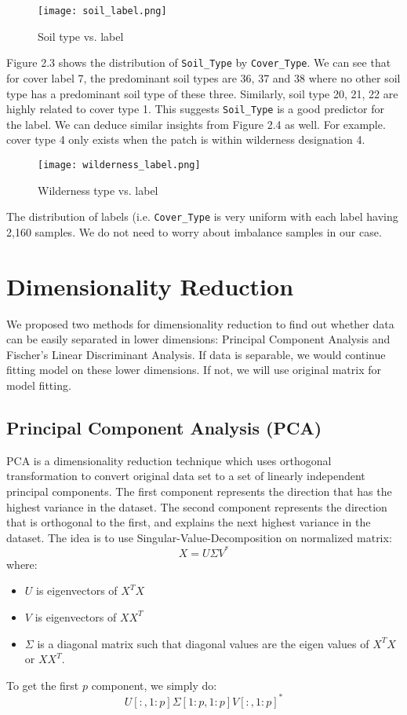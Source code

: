 \documentclass[11pt]{article}
\begin{document}
\begin{figure}[h]
\label{eda3}
\begin{center}
\texttt{[image: soil\_label.png]}
\end{center}
\caption{Soil type vs. label}
\end{figure}

\noindent Figure 2.3 shows the distribution of \texttt{Soil\_Type} by \texttt{Cover\_Type}. We can see that for cover label 7, the predominant soil types are 36, 37 and 38 where no other soil type has a predominant soil type of these three. Similarly, soil type 20, 21, 22 are highly related to cover type 1. This suggests \texttt{Soil\_Type} is a good predictor for the label. We can deduce similar insights from Figure 2.4 as well. For example. cover type 4 only exists when the patch is within wilderness designation 4.

\begin{figure}[h]
\label{eda4}
\begin{center}
\texttt{[image: wilderness\_label.png]}
\end{center}
\caption{Wilderness type vs. label}
\end{figure}

\noindent The distribution of labels (i.e. \texttt{Cover\_Type} is very uniform with each label having 2,160 samples. We do not need to worry about imbalance samples in our case.

\newpage

\section{Dimensionality Reduction}

We proposed two methods for dimensionality reduction to find out whether data can be easily separated in lower dimensions: Principal Component Analysis and Fischer's Linear Discriminant Analysis. If data is separable, we would continue fitting model on these lower dimensions. If not, we will use original matrix for model fitting.

\subsection{Principal Component Analysis (PCA)}
PCA is a dimensionality reduction technique which uses orthogonal transformation to convert original data set to a set of linearly independent principal components. The first component represents the direction that has the highest variance in the dataset. The second component represents the direction that is orthogonal to the first, and explains the next highest variance in the dataset. The idea is to use Singular-Value-Decomposition on normalized matrix:
$$X = U\Sigma V^*$$
where:
\begin{itemize}
\setlength\itemsep{0cm}
\item $U$ is eigenvectors of $X^TX$
\item $V$ is eigenvectors of $XX^T$
\item $\Sigma$ is a diagonal matrix such that diagonal values are the eigen values of $X^TX$ or $XX^T$.
\end{itemize}
To get the first $p$ component, we simply do:
$$U[:,1:p]\Sigma[1:p,1:p] V[:,1:p]^*$$
\end{document}
